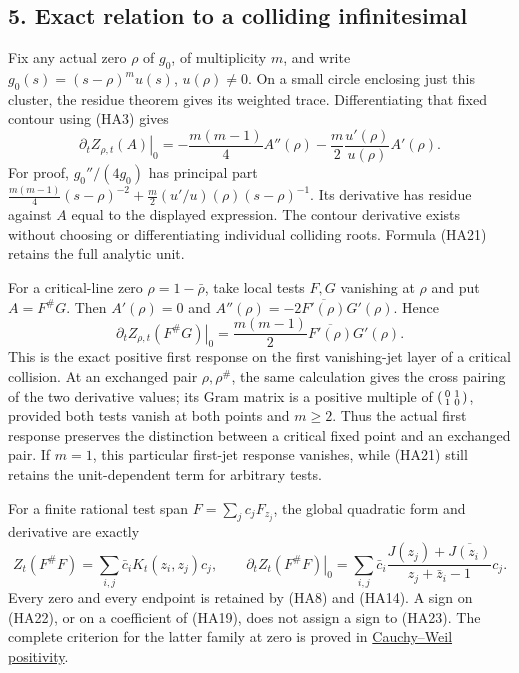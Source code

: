 \documentclass[
  10pt,
  a4paper,
]{article}
\begin{document}
\subsection{5. Exact relation to a colliding
infinitesimal}\label{exact-relation-to-a-colliding-infinitesimal}

Fix any actual zero \(\rho\) of \(g_0\), of multiplicity \(m\), and
write \(g_0(s)=(s-\rho)^m u(s)\), \(u(\rho)\ne0\). On a small circle
enclosing just this cluster, the residue theorem gives its weighted
trace. Differentiating that fixed contour using (HA3) gives \[
\left.\partial_t Z_{\rho,t}(A)\right|_0
=-\frac{m(m-1)}4 A''(\rho)
-\frac m2\frac{u'(\rho)}{u(\rho)}A'(\rho).
\tag{HA21}
\] For proof, \(g_0''/(4g_0)\) has principal part
\(\frac{m(m-1)}4(s-\rho)^{-2}+\frac m2(u'/u)(\rho)(s-\rho)^{-1}\). Its
derivative has residue against \(A\) equal to the displayed expression.
The contour derivative exists without choosing or differentiating
individual colliding roots. Formula (HA21) retains the full analytic
unit.

For a critical-line zero \(\rho=1-\bar\rho\), take local tests \(F,G\)
vanishing at \(\rho\) and put \(A=F^\#G\). Then \(A'(\rho)=0\) and
\(A''(\rho)=-2\overline{F'(\rho)}G'(\rho)\). Hence \[
\left.\partial_t Z_{\rho,t}(F^\#G)\right|_0
=\frac{m(m-1)}2\overline{F'(\rho)}G'(\rho).
\tag{HA22}
\] This is the exact positive first response on the first vanishing-jet
layer of a critical collision. At an exchanged pair \(\rho,\rho^\#\),
the same calculation gives the cross pairing of the two derivative
values; its Gram matrix is a positive multiple of
\(\begin{psmallmatrix}0&1\\1&0\end{psmallmatrix}\), provided both tests
vanish at both points and \(m\ge2\). Thus the actual first response
preserves the distinction between a critical fixed point and an
exchanged pair. If \(m=1\), this particular first-jet response vanishes,
while (HA21) still retains the unit-dependent term for arbitrary tests.

For a finite rational test span \(F=\sum_j c_jF_{z_j}\), the global
quadratic form and derivative are exactly \[
Z_t(F^\#F)=\sum_{i,j}\bar c_iK_t(z_i,z_j)c_j,
\qquad
\left.\partial_t Z_t(F^\#F)\right|_0
=\sum_{i,j}\bar c_i\frac{J(z_j)+\overline{J(z_i)}}{z_j+\bar z_i-1}c_j.
\tag{HA23}
\] Every zero and every endpoint is retained by (HA8) and (HA14). A sign
on (HA22), or on a coefficient of (HA19), does not assign a sign to
(HA23). The complete criterion for the latter family at zero is proved
in \href{CAUCHY_WEIL_POSITIVITY_CRITERION.md}{Cauchy--Weil positivity}.
\end{document}
